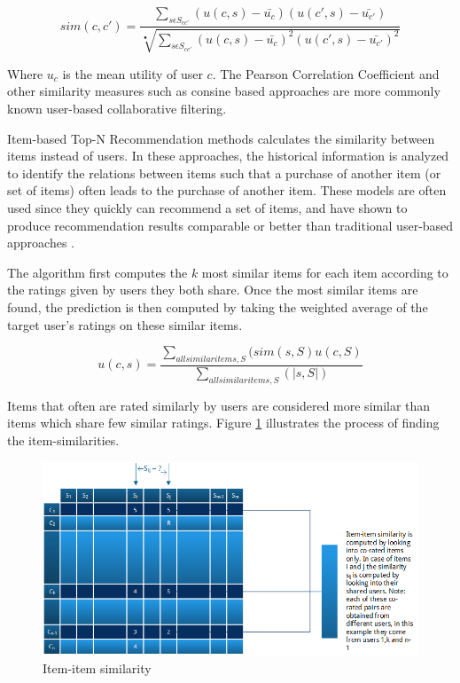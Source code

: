 \begin{equation}
sim(c, c') = \frac{\sum_{s \epsilon S_{cc'}} (u(c, s)-\bar{u_{c}})(u(c',s)-\bar{u_{c'}})}{\sqrt[•]{\sum_{s \epsilon S_{cc'}} (u(c, s)-\bar{u_{c}})^{2}(u(c',s)-\bar{u_{c'}})^{2}}}
\label{equation:pearson}
\end{equation}

Where $u_{c}$ is the mean utility of user $c$. The Pearson Correlation Coefficient and other similarity measures such as consine based approaches are more commonly known user-based collaborative filtering.\linebreak[2]

Item-based Top-N Recommendation methods calculates the similarity between items instead of users. In these approaches, the historical information is analyzed to identify the relations between items such that a purchase of another item (or set of items) often leads to the purchase of another item. These models are often used since they quickly can recommend a set of items, and have shown to produce recommendation results comparable or better than traditional user-based approaches \cite{Karypis2001}.

The algorithm first computes the $k$ most similar items for each item according to the ratings given by users they both share. Once the most similar items are found, the prediction is then computed by taking the weighted average of the target user's ratings on these similar items.

\begin{equation}
u(c,s) = \frac{\sum_{all similar items, S} (sim(s,S)u(c, S)}{\sum_{all similar items, S}(|s,S|)}
\end{equation}

Items that often are rated similarly by users are considered more similar than items which share few similar ratings. Figure \ref{figure:itemsim} illustrates the process of finding the item-similarities.

\begin{figure}[H]
    \includegraphics[width=5in]{image/itemsim.png}
    \centering
    \caption[Item-item similarity]{Item-item similarity}
    \label{figure:itemsim}
\end{figure}

